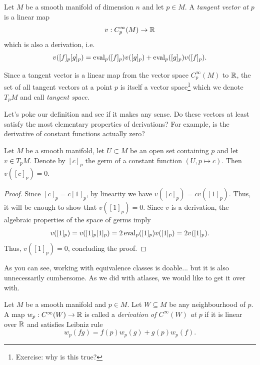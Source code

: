 \begin{definition}
  Let $M$ be a smooth manifold of dimension $n$ and let $p\in M$.
  A \emph{tangent vector at $p$} is a linear map
  \begin{equation}\label{def:tangentvector}
    v: C_p^\infty(M)\to\mathbb{R}
  \end{equation}
  which is also a derivation, i.e.
  \begin{equation}
    v([f]_p [g]_p) =
    \operatorname{eval}_p([f]_p)v([g]_p)
    + \operatorname{eval}_p([g]_p)v([f]_p).
  \end{equation}

  Since a tangent vector is a linear map from the vector space $C_p^\infty(M)$ to $\mathbb{R}$, the set of all tangent vectors at a point $p$ is itself a vector space\footnote{Exercise: why is this true?} which we denote $T_p M$ and call \emph{tangent space}.
\end{definition}

Let's poke our definition and see if it makes any sense.
Do these vectors at least satisfy the most elementary properties of derivations?
For example, is the derivative of constant functions actually zero?

\begin{lemma}\label{lem:f'0is0forconst}
  Let $M$ be a smooth manifold, let $U\subset M$ be an open set containing $p$ and let $v\in T_p M$.
  Denote by $[c]_p$ the germ of a constant function $(U, p \mapsto c)$.
  Then $v([c]_p) = 0$.
\end{lemma}
\begin{proof}
  Since $[c]_p = c [1]_p$, by linearity we have $v([c]_p) = c v([1]_p)$.
  Thus, it will be enough to show that $v([1]_p) = 0$.
  Since $v$ is a derivation, the algebraic properties of the space of germs imply
  \begin{equation}
    v([1]_p) = v([1]_p [1]_p) = 2 \operatorname{eval}_p([1]_p)v([1]_p) = 2 v([1]_p).
  \end{equation}
  Thus, $v([1]_p) = 0$, concluding the proof.
\end{proof}

As you can see, working with equivalence classes is doable... but it is also unnecessarily cumbersome.
As we did with atlases, we would like to get it over with.

\begin{definition}
  Let $M$ be a smooth manifold and $p\in M$.
  Let $W\subseteq M$ be any neighbourhood of $p$.
  A map $w_p:C^\infty(W)\to\mathbb{R}$ is called a \emph{derivation of $C^\infty(W)$ at $p$} if it is linear over $\mathbb{R}$ and satisfies Leibniz rule
  \begin{equation}
    w_p(fg) = f(p)w_p(g) + g(p)w_p(f).
  \end{equation}
\end{definition}

